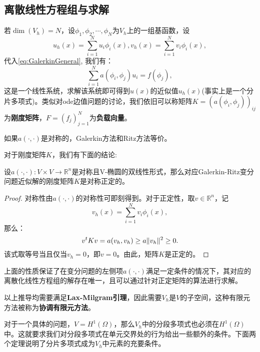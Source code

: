 \subsection{离散线性方程组与求解}
若$\dim(V_{h})=N$，设$\phi_{1},\phi_{2},\cdots,\phi_{N}$为$V_{h}$上的一组基函数，设
\begin{equation}
    u_{h}(x)=\sum_{i=1}^{N}u_{i}\phi_{i}(x),v_{h}(x)=\sum_{i=1}^{N}v_{i}\phi_{i}(x),
\end{equation}
代入\eqref{eq:GalerkinGeneral}, 我们有：
\begin{equation}
    \sum_{i=1}^{N}a(\phi_{i},\phi_{j})u_{i}=f(\phi_{j}),
\end{equation}
这是一个线性系统，求解该系统即可得到$u(x)$的近似值$u_{h}(x)$(事实上是一个分片多项式)。类似对ode边值问题的讨论，我们依旧可以称矩阵$K=(a(\phi_{i},\phi_{j}))_{ij}$为\textbf{刚度矩阵}，$F=(f_{j})_{j=1}^{N}$为\textbf{负载向量}。

如果$a(\cdot,\cdot)$是对称的，Galerkin方法和Ritz方法等价。

对于刚度矩阵$K$，我们有下面的结论:
\begin{proposition}
    设$a(\cdot,\cdot):V\times V\rightarrow \mathbb{R}^{n}$是对称且V-椭圆的双线性形式，那么对应Galerkin-Ritz变分问题近似解的刚度矩阵$K$是对称正定的。
\end{proposition}
\begin{proof}
    对称性由$a(\cdot,\cdot)$的对称性可即刻得到。对于正定性，取$v\in\mathbb{R}^{n}$，记
    \begin{equation}
        v_{h}(x)=\sum_{i=1}^{N}v_{i}\phi_{i}(x),
    \end{equation}
    那么：
    \begin{equation}
        v^{t}Kv=a(v_{h},v_{h})\ge a\|v_{h}\|^{2}\ge 0.
    \end{equation}
    该式取等号当且仅当$v_{h}=0$，即$v=0$。由此，矩阵$K$是正定的。
\end{proof}
\begin{remark}
    上面的性质保证了在变分问题的左侧项$a(\cdot,\cdot)$满足一定条件的情况下，其对应的离散化线性方程组的解存在唯一，且可以通过针对正定矩阵的算法进行求解。
\end{remark}
以上推导均需要满足\textbf{Lax-Milgram引理}，因此需要$V_{h}$是$V$的子空间，这种有限元方法被称为\textbf{协调有限元方法}。

对于一个具体的问题，$V=H^{1}(\Omega)$，那么$V_{h}$中的分段多项式也必须在$H^{1}(\Omega)$中。这就要求我们对分段多项式在单元交界处的行为给出一些额外的条件。下面两个定理说明了分片多项式成为$V_{h}$中元素的充要条件。

